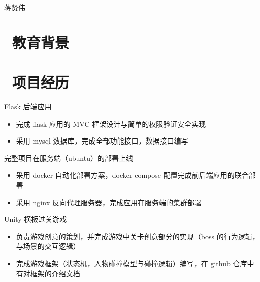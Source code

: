 \documentclass{resume}
\begin{document}

\large 蒋贤伟  



 
\section{\faGraduationCap\  教育背景}

\section{\faUsers\ 项目经历}
\begin{onehalfspacing}
Flask 后端应用
\begin{itemize}
  \item 完成 flask 应用的 MVC 框架设计与简单的权限验证安全实现
  \item 采用 mysql 数据库，完成全部功能接口，数据接口编写
\end{itemize}
完整项目在服务端（ubuntu）的部署上线
\begin{itemize}
  \item 采用 docker 自动化部署方案，docker-compose 配置完成前后端应用的联合部署
  \item 采用 nginx 反向代理服务器，完成应用在服务端的集群部署
\end{itemize}
\end{onehalfspacing}

\begin{onehalfspacing}
Unity 横板过关游戏
\begin{itemize}
  \item 负责游戏创意的策划，并完成游戏中关卡创意部分的实现（boss 的行为逻辑，与场景的交互逻辑）
  \item 完成游戏框架（状态机，人物碰撞模型与碰撞逻辑）编写，在 github 仓库中有对框架的介绍文档
\end{itemize}
\end{onehalfspacing}
\end{document}
